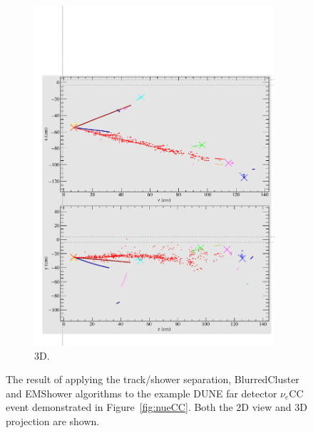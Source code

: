 \begin{figure}
\begin{subfigure}[t]{0.48\linewidth}
    \includegraphics[width=0.98\textwidth]{NuECCTrackShower3D.pdf}
    \caption{3D.}
    \label{fig:nueCCRecon3D}
  \end{subfigure}
  \caption[The result of applying the track/shower separation, BlurredCluster and EMShower algorithms to the example DUNE far detector $\nu_e$CC event demonstrated in Figure~\ref{fig:nueCC}.]{The result of applying the track/shower separation, BlurredCluster and EMShower algorithms to the example DUNE far detector $\nu_e$CC event demonstrated in Figure~\ref{fig:nueCC}.  Both the 2D view and 3D projection are shown.}
  \label{fig:nueCCRecon}
\end{figure}

